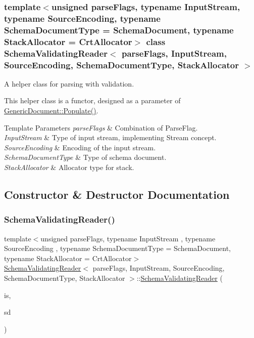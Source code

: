 \subsubsection*{template$<$unsigned parse\+Flags, typename Input\+Stream, typename Source\+Encoding, typename Schema\+Document\+Type = Schema\+Document, typename Stack\+Allocator = Crt\+Allocator$>$\newline
class Schema\+Validating\+Reader$<$ parse\+Flags, Input\+Stream, Source\+Encoding, Schema\+Document\+Type, Stack\+Allocator $>$}

A helper class for parsing with validation. 

This helper class is a functor, designed as a parameter of \hyperlink{classGenericDocument_a36fbc7d0a9595d26e0d2c8859d207d1f}{Generic\+Document\+::\+Populate()}.


\begin{DoxyTemplParams}{Template Parameters}
{\em parse\+Flags} & Combination of Parse\+Flag. \\
\hline
{\em Input\+Stream} & Type of input stream, implementing Stream concept. \\
\hline
{\em Source\+Encoding} & Encoding of the input stream. \\
\hline
{\em Schema\+Document\+Type} & Type of schema document. \\
\hline
{\em Stack\+Allocator} & Allocator type for stack. \\
\hline
\end{DoxyTemplParams}


\subsection{Constructor \& Destructor Documentation}
\mbox{\label{classSchemaValidatingReader_ae7945b71687ad3dd13b9c3d096892eac}} 
\subsubsection{\texorpdfstring{Schema\+Validating\+Reader()}{SchemaValidatingReader()}}
{\footnotesize\ttfamily template$<$unsigned parse\+Flags, typename Input\+Stream , typename Source\+Encoding , typename Schema\+Document\+Type  = Schema\+Document, typename Stack\+Allocator  = Crt\+Allocator$>$ \\
\hyperlink{classSchemaValidatingReader}{Schema\+Validating\+Reader}$<$ parse\+Flags, Input\+Stream, Source\+Encoding, Schema\+Document\+Type, Stack\+Allocator $>$\+::\hyperlink{classSchemaValidatingReader}{Schema\+Validating\+Reader} (\begin{DoxyParamCaption}\item[{Input\+Stream \&}]{is,  }\item[{const Schema\+Document\+Type \&}]{sd }\end{DoxyParamCaption})\hspace{0.3cm}{\ttfamily [inline]}}



